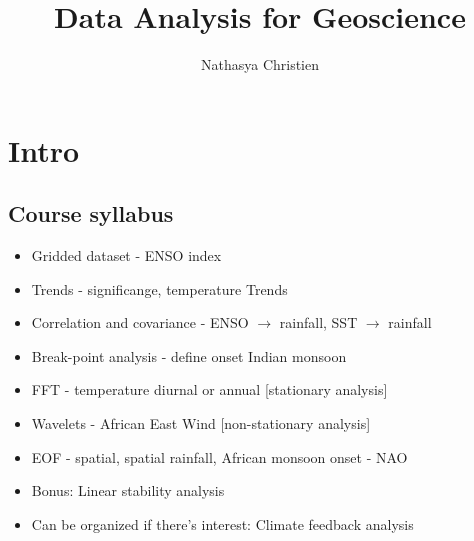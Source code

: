 \documentclass{article}
\title{Data Analysis for Geoscience}
\author{Nathasya Christien}
\begin{document}
\maketitle

\section{Intro}
\subsection{Course syllabus}
\begin{itemize}
    \item Gridded dataset - ENSO index
    \item Trends - significange, temperature Trends
    \item Correlation and covariance - ENSO $\rightarrow$ rainfall, SST $\rightarrow$ rainfall
    \item Break-point analysis - define onset Indian monsoon
    \item FFT - temperature diurnal or annual [stationary analysis]
    \item Wavelets - African East Wind [non-stationary analysis]
    \item EOF - spatial, spatial rainfall, African monsoon onset - NAO
    \item Bonus: Linear stability analysis 
    \item Can be organized if there's interest: Climate feedback analysis
\end{itemize}
\end{document}
